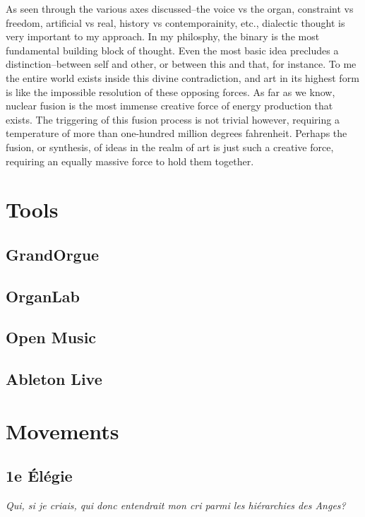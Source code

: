 \documentclass[12pt,twoside,maitrise]{dms}
\theoremstyle{definition}
\begin{document}
As seen through the various axes discussed--the voice vs the organ, constraint vs freedom, artificial vs real, history vs contemporainity, etc., dialectic thought is very important to my approach.
In my philosphy, the binary is the most fundamental building block of thought.
Even the most basic idea precludes a distinction--between self and other, or between this and that, for instance.
To me the entire world exists inside this divine contradiction, and art in its highest form is like the impossible resolution of these opposing forces.
As far as we know, nuclear fusion is the most immense creative force of energy production that exists.
The triggering of this fusion process is not trivial however, requiring a temperature of more than one-hundred million degrees fahrenheit.
Perhaps the fusion, or synthesis, of ideas in the realm of art is just such a creative force, requiring an equally massive force to hold them together.

\section{Tools}

\subsection{GrandOrgue}

\subsection{OrganLab}

\subsection{Open Music}

\subsection{Ableton Live}

\section{Movements}
\anglais
\subsection{1e Élégie}

\epigraph{\textit{Qui, si je criais, qui donc entendrait mon cri parmi les hiérarchies des Anges?}}{}
\end{document}
